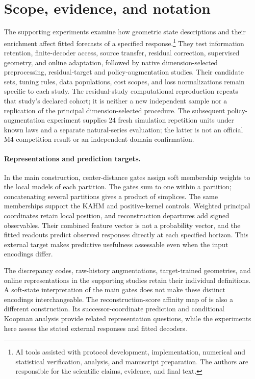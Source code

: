 \documentclass[10pt]{article}
\begin{document}
\section{Scope, evidence, and notation}\label{supp:scope}
The supporting experiments examine how geometric state descriptions and
their enrichment affect fitted forecasts of a specified response.\footnote{AI tools assisted with
protocol development, implementation, numerical and statistical
verification, analysis, and manuscript preparation. The authors are
responsible for the scientific claims, evidence, and final text.}
They test information retention, finite-decoder access, source transfer,
residual correction, supervised geometry, and online adaptation, followed
by native dimension-selected preprocessing, residual-target and
policy-augmentation studies.
Their candidate sets, tuning rules, data populations, cost scopes, and
loss normalizations remain specific to each study. The residual-study
computational reproduction repeats that study's declared cohort; it is
neither a new independent sample nor a replication of the principal
dimension-selected procedure. The subsequent policy-augmentation
experiment supplies 24 fresh simulation repetition units under known
laws and a separate natural-series evaluation; the latter is not an
official M4 competition result or an independent-domain confirmation.

\paragraph{Representations and prediction targets.}
In the main construction, center-distance gates assign soft membership
weights to the local models of each partition. The gates sum to one
within a partition; concatenating several partitions gives a product
of simplices. The same memberships support the KAHM and positive-kernel
controls. Weighted principal coordinates retain local position, and
reconstruction departures add signed observables. Their combined
feature vector is not a probability vector, and the fitted readouts
predict observed responses directly at each specified horizon.
This external target makes predictive usefulness assessable even when
the input encodings differ.

The discrepancy codes, raw-history augmentations, target-trained
geometries, and online representations in the supporting studies
retain their individual definitions. A soft-state interpretation of the
main gates does not make these distinct encodings interchangeable.
The reconstruction-score affinity map of
\citet{KumarKargaran2026Limits} is also a different construction.
Its successor-coordinate prediction and conditional Koopman analysis
provide related representation questions, while the experiments here
assess the stated external responses and fitted decoders.
\end{document}

